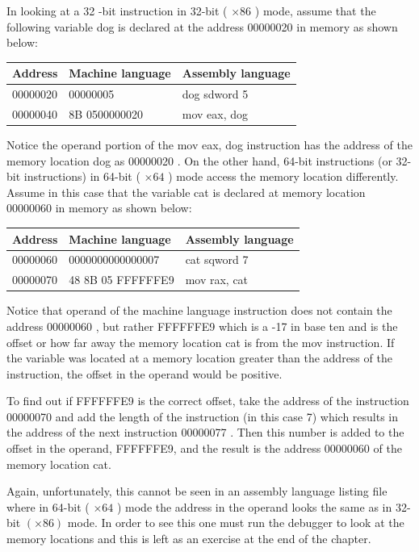 \documentclass[10pt]{article}
\begin{document}
In looking at a 32 -bit instruction in 32-bit ( $\times 86$ ) mode, assume that the following variable dog is declared at the address 00000020 in memory as shown below:

\begin{center}
\begin{tabular}{|l|l|l|}
\hline
Address & Machine language & Assembly language \\
\hline
00000020 & 00000005 & dog sdword 5 \\
\hline
00000040 & 8B 0500000020 & mov eax, dog \\
\hline
\end{tabular}
\end{center}

Notice the operand portion of the mov eax, dog instruction has the address of the memory location dog as 00000020 . On the other hand, 64-bit instructions (or 32-bit instructions) in 64-bit ( $\times 64$ ) mode access the memory location differently. Assume in this case that the variable cat is declared at memory location 00000060 in memory as shown below:

\begin{center}
\begin{tabular}{|l|l|l|}
\hline
Address & Machine language & Assembly language \\
\hline
00000060 & 0000000000000007 & cat sqword 7 \\
\hline
00000070 & 48 8B 05 FFFFFFE9 & mov rax, cat \\
\hline
\end{tabular}
\end{center}

Notice that operand of the machine language instruction does not contain the address 00000060 , but rather FFFFFFE9 which is a -17 in base ten and is the offset or how far away the memory location cat is from the mov instruction. If the variable was located at a memory location greater than the address of the instruction, the offset in the operand would be positive.

To find out if FFFFFFE9 is the correct offset, take the address of the instruction 00000070 and add the length of the instruction (in this case 7) which results in the address of the next instruction 00000077 . Then this number is added to the offset in the operand, FFFFFFE9, and the result is the address 00000060 of the memory location cat.

Again, unfortunately, this cannot be seen in an assembly language listing file where in 64-bit ( $\times 64$ ) mode the address in the operand looks the same as in 32-bit $(\times 86)$ mode. In order to see this one must run the debugger to look at the memory locations and this is left as an exercise at the end of the chapter.
\end{document}
